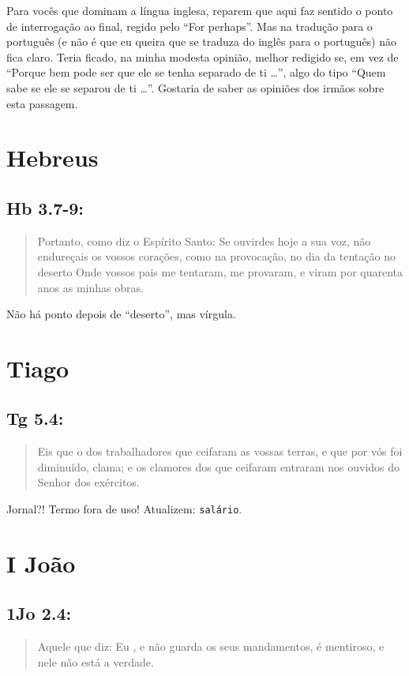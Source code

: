 Para vocês que dominam a língua inglesa, reparem que aqui faz sentido o ponto de interrogação ao final, regido pelo ``For perhaps''. Mas na tradução para o português (e não é que eu queira que se traduza do inglês para o português) não fica claro. Teria ficado, na minha modesta opinião, melhor redigido se, em vez de ``Porque bem pode ser que ele se tenha separado de ti \ldots{}'', algo do tipo ``Quem sabe se ele se separou de ti \ldots{}''. Gostaria de saber as opiniões dos irmãos sobre esta passagem.

\section{Hebreus}
\subsection{Hb 3.7-9:}
\begin{quote}
    \small
Portanto, como diz o Espírito Santo: Se ouvirdes hoje a sua voz, não endureçais os vossos corações, como na provocação, no dia da tentação no deserto Onde vossos pais me tentaram, me provaram, e viram por quarenta anos as minhas obras.
\end{quote}

Não há ponto depois de ``deserto'', mas vírgula.

\section{Tiago}
\subsection{Tg 5.4:}
\begin{quote}
    \small
Eis que o  dos trabalhadores que ceifaram as vossas terras, e que por vós foi diminuído, clama; e os clamores dos que ceifaram entraram nos ouvidos do Senhor dos exércitos.
\end{quote}

Jornal?! Termo fora de uso! Atualizem: \texttt{salário}.

\section{I João}
\subsection{1Jo 2.4:}
\begin{quote}
    \small
Aquele que diz: Eu , e não guarda os seus mandamentos, é mentiroso, e nele não está a verdade.
\end{quote}

